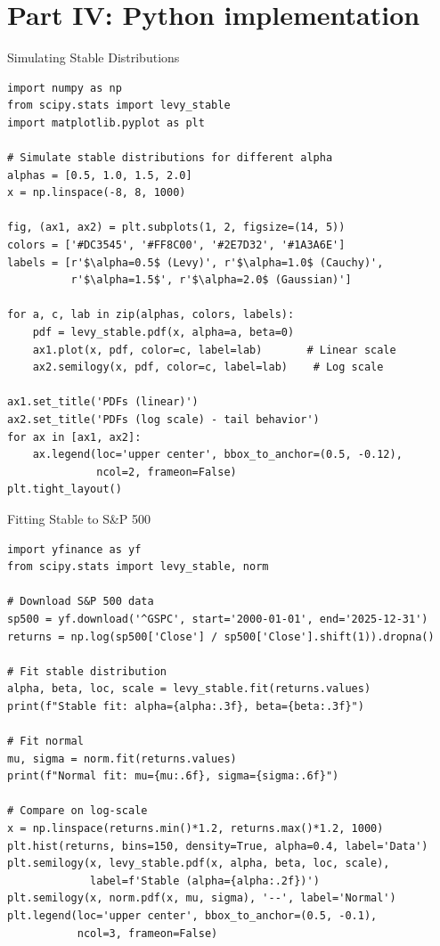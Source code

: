 \documentclass[9pt, aspectratio=169, t]{beamer}
\theoremstyle{definition}
\begin{document}
\section{Part IV: Python implementation}

\begin{frame}[fragile]{Simulating Stable Distributions}

\begin{lstlisting}
import numpy as np
from scipy.stats import levy_stable
import matplotlib.pyplot as plt

# Simulate stable distributions for different alpha
alphas = [0.5, 1.0, 1.5, 2.0]
x = np.linspace(-8, 8, 1000)

fig, (ax1, ax2) = plt.subplots(1, 2, figsize=(14, 5))
colors = ['#DC3545', '#FF8C00', '#2E7D32', '#1A3A6E']
labels = [r'$\alpha=0.5$ (Levy)', r'$\alpha=1.0$ (Cauchy)',
          r'$\alpha=1.5$', r'$\alpha=2.0$ (Gaussian)']

for a, c, lab in zip(alphas, colors, labels):
    pdf = levy_stable.pdf(x, alpha=a, beta=0)
    ax1.plot(x, pdf, color=c, label=lab)       # Linear scale
    ax2.semilogy(x, pdf, color=c, label=lab)    # Log scale

ax1.set_title('PDFs (linear)')
ax2.set_title('PDFs (log scale) - tail behavior')
for ax in [ax1, ax2]:
    ax.legend(loc='upper center', bbox_to_anchor=(0.5, -0.12),
              ncol=2, frameon=False)
plt.tight_layout()
\end{lstlisting}
\end{frame}

\begin{frame}[fragile]{Fitting Stable to S\&P 500}

\begin{lstlisting}
import yfinance as yf
from scipy.stats import levy_stable, norm

# Download S&P 500 data
sp500 = yf.download('^GSPC', start='2000-01-01', end='2025-12-31')
returns = np.log(sp500['Close'] / sp500['Close'].shift(1)).dropna()

# Fit stable distribution
alpha, beta, loc, scale = levy_stable.fit(returns.values)
print(f"Stable fit: alpha={alpha:.3f}, beta={beta:.3f}")

# Fit normal
mu, sigma = norm.fit(returns.values)
print(f"Normal fit: mu={mu:.6f}, sigma={sigma:.6f}")

# Compare on log-scale
x = np.linspace(returns.min()*1.2, returns.max()*1.2, 1000)
plt.hist(returns, bins=150, density=True, alpha=0.4, label='Data')
plt.semilogy(x, levy_stable.pdf(x, alpha, beta, loc, scale),
             label=f'Stable (alpha={alpha:.2f})')
plt.semilogy(x, norm.pdf(x, mu, sigma), '--', label='Normal')
plt.legend(loc='upper center', bbox_to_anchor=(0.5, -0.1),
           ncol=3, frameon=False)
\end{lstlisting}
\end{frame}
\end{document}
